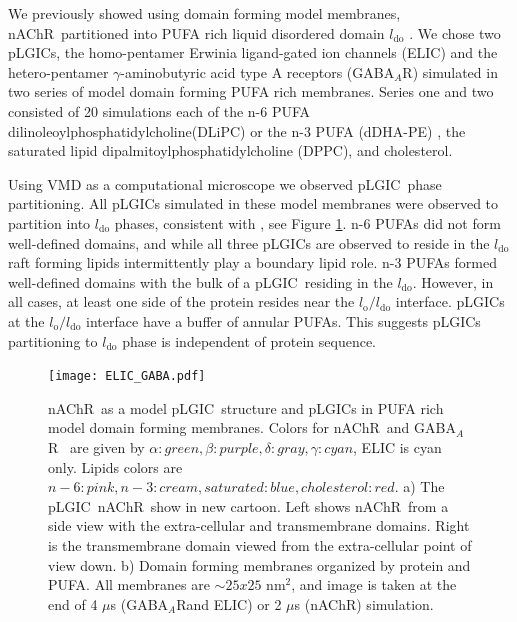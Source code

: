 \documentclass[12pt]{ruthesis_nofloat}
\newcommand{\lo}{l_{\mathrm{o}}}
\newcommand{\ldo}{l_{\mathrm{do}}}
\newcommand{\nachr}{nAChR}
\newcommand{\plgic}{pLGIC}
\newcommand{\gabaa}{GABA$_A$R}
\begin{document}
We previously showed using domain forming model membranes,  \nachr~partitioned into PUFA rich liquid disordered domain $\ldo$ \citep{Sharp2019}. We chose two \plgic s, the homo-pentamer Erwinia ligand-gated ion channels (ELIC) and the hetero-pentamer $\gamma$-aminobutyric acid type A receptors (\gabaa) simulated in two series of model domain forming PUFA rich membranes. Series one and two consisted of 20 simulations each of the n-6 PUFA dilinoleoylphosphatidylcholine(DLiPC) or the n-3 PUFA  (dDHA-PE) , the saturated lipid dipalmitoylphosphatidylcholine (DPPC), and cholesterol. 

Using VMD as a computational microscope \citep{HUMP96} we observed \plgic~phase partitioning. All \plgic s simulated in these model membranes were observed to partition into $\ldo$ phases, consistent with \citep{Sharp2019}, see Figure \ref{fig:dom_plgic}.  n-6 PUFAs did not form well-defined domains, and while all three \plgic s are observed to reside in the $\ldo$ raft forming lipids intermittently play a boundary lipid role. n-3 PUFAs formed well-defined domains with the bulk of a \plgic~residing in the $\ldo$. However, in all cases, at least one side of the protein resides near the $\lo/\ldo$ interface. \plgic s at the $\lo/\ldo$ interface have a buffer of annular PUFAs. This suggests \plgic s partitioning to $\ldo$ phase is independent of protein sequence. 

\renewcommand{\thefigure}{A1}
\begin{figure}
		\texttt{[image: ELIC\_GABA.pdf]}
		\caption[\nachr~as a model \plgic~structure and \plgic s in PUFA rich model domain forming membranes.] {\nachr~as a model \plgic~structure and \plgic s in PUFA rich model domain forming membranes. Colors for \nachr~and \gabaa~ are given by $\alpha:green,\beta:purple,\delta:gray,\gamma:cyan$, ELIC is cyan only. Lipids colors are $n-6:pink,n-3:cream,saturated:blue,cholesterol:red$. a) The \plgic~\nachr~show in new cartoon. Left shows \nachr~from a side view with the extra-cellular and transmembrane domains. Right is the transmembrane domain viewed from the extra-cellular point of view down. b) Domain forming membranes organized by protein and PUFA. All membranes are $\sim25x25$ nm$^2$, and image is taken at the end of 4 $\mu$s (\gabaa and ELIC) or 2 $\mu$s (\nachr)  simulation.}
		\label{fig:dom_plgic}
\end{figure}
\FloatBarrier

\end{document}
